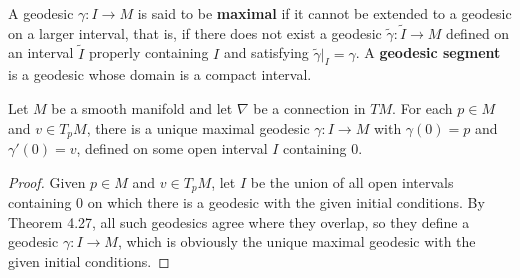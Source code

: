 A geodesic $\gamma: I \to M$ is said to be \textbf{maximal} if it cannot be extended to a geodesic on a larger interval, that is, if there does not exist a geodesic $\tilde{\gamma}: \tilde{I} \to M$ defined on an interval $\tilde{I}$ properly containing $I$ and satisfying $\tilde{\gamma}|_I = \gamma$. A \textbf{geodesic segment} is a geodesic whose domain is a compact interval.


\begin{corollary}
\label{cor:existence-of-maximal-geodesic}
Let $M$ be a smooth manifold and let $\nabla$ be a connection in $TM$. For each $p \in M$ and $v \in T_p M$, there is a unique maximal geodesic $\gamma : I \to M$ with $\gamma(0) = p$ and $\gamma'(0) = v$, defined on some open interval $I$ containing $0$.
\end{corollary}

\begin{proof}
Given $p \in M$ and $v \in T_p M$, let $I$ be the union of all open intervals containing $0$ on which there is a geodesic with the given initial conditions. By Theorem 4.27, all such geodesics agree where they overlap, so they define a geodesic $\gamma : I \to M$, which is obviously the unique maximal geodesic with the given initial conditions.
\end{proof}

